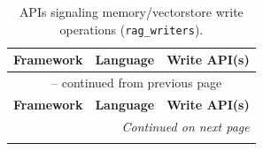 {\footnotesize
\renewcommand{\arraystretch}{0.9}
\begin{longtable}{@{}p{}p{}p{}@{}}
\caption{APIs signaling memory/vectorstore write operations (\texttt{rag\_writers}).}
\label{tab:rag-write-apis} \\
\toprule
\textbf{Framework} & \textbf{Language} & \textbf{Write API(s)} \\
\midrule
\endfirsthead
\multicolumn{3}{c}{\tablename\ \thetable{} -- continued from previous page} \\
\toprule
\textbf{Framework} & \textbf{Language} & \textbf{Write API(s)} \\
\midrule
\endhead
\midrule
\multicolumn{3}{r}{\textit{Continued on next page}} \\
\endfoot
\bottomrule
\endlastfoot


\end{longtable}}
